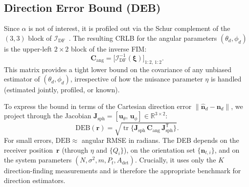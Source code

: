 \documentclass[journal]{IEEEtran}
\newcommand{\added}[1]{{\color{blue}#1}}
\begin{document}
\added{\subsection{Direction Error Bound (DEB)}
\label{subsec:DEB}

Since $\alpha$ is not of interest, it is profiled out via the Schur complement of the $(3,3)$ block of $\mathcal{I}_{\mathrm{DF}}$~\cite{Kay1993}.  The resulting CRLB for the angular parameters $(\theta_d,\phi_d)$ is the upper-left $2\times2$ block of the inverse FIM:
\begin{equation}
\mathbf{C}_{\mathrm{ang}} = \bigl[\mathcal{I}_{\mathrm{DF}}^{-1}(\boldsymbol\xi)\bigr]_{1:2,\,1:2}.
\label{eq:C_ang}
\end{equation}
This matrix provides a tight lower bound on the covariance of any unbiased estimator of $(\theta_d,\phi_d)$, irrespective of how the nuisance parameter $\eta$ is handled (estimated jointly, profiled, or known).

To express the bound in terms of the Cartesian direction error $\lVert\hat{\mathbf{n}}_d - \mathbf{n}_d\rVert$, we project through the Jacobian $\mathbf{J}_{\mathrm{sph}}=[\mathbf{u}_\theta,\,\mathbf{u}_\phi]\in\mathbb{R}^{3\times2}$:
\begin{equation}
\mathrm{DEB}(\mathbf{r})
= \sqrt{\operatorname{tr}\!\bigl\{\mathbf{J}_{\mathrm{sph}}\,\mathbf{C}_{\mathrm{ang}}\,\mathbf{J}_{\mathrm{sph}}^{\mathsf T}\bigr\}}.
\label{eq:DEB}
\end{equation}
For small errors, $\mathrm{DEB}\approx$ angular RMSE in radians.  The DEB depends on the receiver position~$\mathbf{r}$ (through $\eta$ and $\{Q_i\}$), on the orientation set $\{\mathbf{n}_{t,i}\}$, and on the system parameters $(N,\sigma^2,m,P_t,A_{\mathrm{det}})$.  Crucially, it uses only the $K$ direction-finding measurements and is therefore the appropriate benchmark for direction estimators.}
\end{document}
